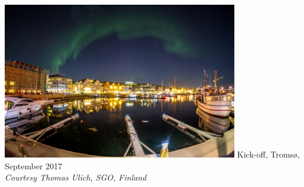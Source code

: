 \begin{frame}[fragile,t]
\frametitle{\hfill}
\vspace{\mytopbit}
\begin{center}
\includegraphics[height=2.7in]{20170907-EOS6D-IMG_5646s.jpg}
\vfill
    {\colblack \ED Kick-off, Troms{\o}, September 2017} \\
    {\colblack \scriptsize \it Courtesy Thomas Ulich, SGO, Finland}
\end{center}
\end{frame}
